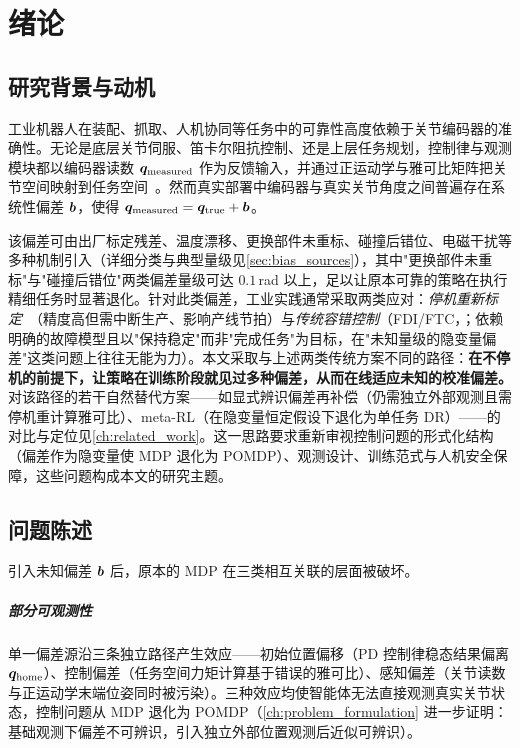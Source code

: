 
\chapter{绪论}\label{ch:introduction}

\section{研究背景与动机}\label{sec:background}

工业机器人在装配、抓取、人机协同等任务中的可靠性高度依赖于关节编码器的准确性。无论是底层关节伺服、笛卡尔阻抗控制、还是上层任务规划，控制律与观测模块都以编码器读数 $\bm{q}_{\text{measured}}$ 作为反馈输入，并通过正运动学与雅可比矩阵把关节空间映射到任务空间~\cite{siciliano2010robotics}。然而真实部署中编码器与真实关节角度之间普遍存在系统性偏差 $\bm{b}$，使得 $\bm{q}_{\text{measured}} = \bm{q}_{\text{true}} + \bm{b}$。

该偏差可由出厂标定残差、温度漂移、更换部件未重标、碰撞后错位、电磁干扰等多种机制引入（详细分类与典型量级见\cref{sec:bias_sources}），其中"更换部件未重标"与"碰撞后错位"两类偏差量级可达 $0.1$\,rad 以上，足以让原本可靠的策略在执行精细任务时显著退化。针对此类偏差，工业实践通常采取两类应对：\emph{停机重新标定}~\cite{kana2022fast,gong2000nongeometric}（精度高但需中断生产、影响产线节拍）与\emph{传统容错控制}（FDI/FTC，\cite{blanke2016diagnosis}；依赖明确的故障模型且以"保持稳定"而非"完成任务"为目标，在"未知量级的隐变量偏差"这类问题上往往无能为力）。本文采取与上述两类传统方案不同的路径：\textbf{在不停机的前提下，让策略在训练阶段就见过多种偏差，从而在线适应未知的校准偏差。}对该路径的若干自然替代方案——如显式辨识偏差再补偿（仍需独立外部观测且需停机重计算雅可比）、meta-RL（在隐变量恒定假设下退化为单任务 DR）——的对比与定位见\cref{ch:related_work}。这一思路要求重新审视控制问题的形式化结构（偏差作为隐变量使 MDP 退化为 POMDP）、观测设计、训练范式与人机安全保障，这些问题构成本文的研究主题。

\section{问题陈述}\label{sec:problem_statement}

引入未知偏差 $\bm{b}$ 后，原本的 MDP 在三类相互关联的层面被破坏。

\paragraph{部分可观测性}单一偏差源沿三条独立路径产生效应——初始位置偏移（PD 控制律稳态结果偏离 $\bm{q}_{\text{home}}$）、控制偏差（任务空间力矩计算基于错误的雅可比）、感知偏差（关节读数与正运动学末端位姿同时被污染）。三种效应均使智能体无法直接观测真实关节状态，控制问题从 MDP 退化为 POMDP（\cref{ch:problem_formulation} 进一步证明：基础观测下偏差不可辨识，引入独立外部位置观测后近似可辨识）。

